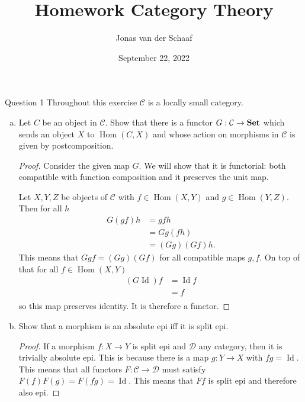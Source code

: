 \documentclass{article}
\title{Homework Category Theory}
\author{Jonas van der Schaaf}
\date{September 22, 2022}
\DeclareMathOperator{\Id}{Id}
\DeclareMathOperator{\Hom}{Hom}
\newcommand{\catset}{{\bf Set}}
\newcommand{\cat}{\mathcal{C}}
\newcommand{\catt}{\mathcal{D}}
\newenvironment{question}[1][]{\begin{paragraph}{Question #1}}{\end{paragraph}}
\theoremstyle{definition}
\begin{document}
\maketitle

\begin{question}[1]
    Throughout this exercise \(\cat\) is a locally small category.

    \begin{enumerate}[(a)]
        \item Let \(C\) be an object in \(\cat\). Show that there is a functor
              \(G:\cat\to\catset\) which sends an object \(X\) to \(\Hom(C,X)\)
              and whose action on morphisms in \(\cat\) is given by
              postcomposition.

              \begin{proof}
                  Consider the given map \(G\). We will show that it is
                  functorial: both compatible with function composition and it
                  preserves the unit map.

                  Let \(X,Y,Z\) be objects of \(\cat\) with \(f\in\Hom(X,Y)\)
                  and \(g\in\Hom(Y,Z)\). Then for all \(h\)
                  \begin{align*}
                      G(gf)h & =gfh        \\
                             & =Gg(fh)     \\
                             & =(Gg)(Gf)h.
                  \end{align*}
                  This means that \(Ggf=(Gg)(Gf)\) for all compatible maps
                  \(g,f\).
                  On top of that for all \(f\in\Hom(X,Y)\)
                  \begin{align*}
                      (G\Id)f & =\Id f \\
                              & =f     \\
                  \end{align*}
                  so this map preserves identity. It is therefore a functor.
              \end{proof}

        \item Show that a morphism is an absolute epi iff it is split epi.

              \begin{proof}
                  If a morphism \(f:X\to Y\) is split epi and \(\catt\) any
                  category, then it is trivially absolute epi. This is because
                  there is a map \(g:Y\to X\) with \(fg=\Id\). This means that
                  all functors \(F:\cat\to\catt\) must satisfy
                  \(F(f)F(g)=F(fg)=\Id\). This means that \(Ff\) is split epi
                  and therefore also epi.


\end{proof}
\end{enumerate}
\end{question}
\end{document}
